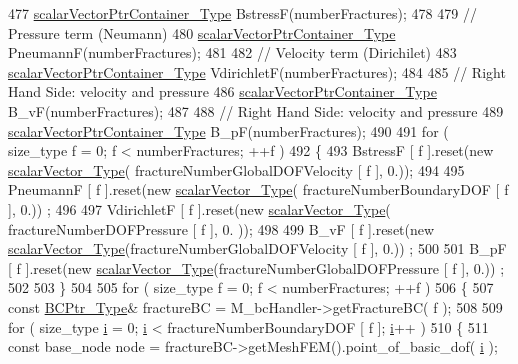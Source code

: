 \begin{DoxyCode}
477     \hyperlink{Core_8h_a20f0354ac7b92989514c678f4cdfcb6b}{scalarVectorPtrContainer\_Type} BstressF(numberFractures);
478 
479     \textcolor{comment}{// Pressure term (Neumann)}
480     \hyperlink{Core_8h_a20f0354ac7b92989514c678f4cdfcb6b}{scalarVectorPtrContainer\_Type} PneumannF(numberFractures);
481 
482     \textcolor{comment}{// Velocity term (Dirichilet)}
483     \hyperlink{Core_8h_a20f0354ac7b92989514c678f4cdfcb6b}{scalarVectorPtrContainer\_Type} VdirichletF(numberFractures);
484 
485     \textcolor{comment}{// Right Hand Side: velocity and pressure}
486     \hyperlink{Core_8h_a20f0354ac7b92989514c678f4cdfcb6b}{scalarVectorPtrContainer\_Type} B\_vF(numberFractures);
487 
488     \textcolor{comment}{// Right Hand Side: velocity and pressure}
489     \hyperlink{Core_8h_a20f0354ac7b92989514c678f4cdfcb6b}{scalarVectorPtrContainer\_Type} B\_pF(numberFractures);
490     
491     \textcolor{keywordflow}{for} ( size\_type f = 0; f < numberFractures; ++f )
492     \{
493         BstressF [ f ].reset(\textcolor{keyword}{new} \hyperlink{Core_8h_a4e75b5863535ba1dd79942de2846eff0}{scalarVector\_Type}( fractureNumberGlobalDOFVelocity [ f ],
       0.));
494 
495         PneumannF [ f ].reset(\textcolor{keyword}{new} \hyperlink{Core_8h_a4e75b5863535ba1dd79942de2846eff0}{scalarVector\_Type}( fractureNumberBoundaryDOF [ f ], 0.))
      ;
496 
497         VdirichletF [ f ].reset(\textcolor{keyword}{new} \hyperlink{Core_8h_a4e75b5863535ba1dd79942de2846eff0}{scalarVector\_Type}( fractureNumberDOFPressure [ f ], 0.
      ));
498 
499         B\_vF [ f ].reset(\textcolor{keyword}{new} \hyperlink{Core_8h_a4e75b5863535ba1dd79942de2846eff0}{scalarVector\_Type}(fractureNumberGlobalDOFVelocity [ f ], 0.))
      ;
500 
501         B\_pF [ f ].reset(\textcolor{keyword}{new} \hyperlink{Core_8h_a4e75b5863535ba1dd79942de2846eff0}{scalarVector\_Type}(fractureNumberGlobalDOFPressure [ f ], 0.))
      ;
502         
503     \}
504 
505     \textcolor{keywordflow}{for} ( size\_type f = 0; f < numberFractures; ++f )
506     \{
507         \textcolor{keyword}{const} \hyperlink{BC_8h_a088c36f945ad8f6e7e0c7c423994c6ec}{BCPtr\_Type}& fractureBC = M\_bcHandler->getFractureBC( f );
508 
509         \textcolor{keywordflow}{for} ( size\_type \hyperlink{matrici_8m_a6f6ccfcf58b31cb6412107d9d5281426}{i} = 0; \hyperlink{matrici_8m_a6f6ccfcf58b31cb6412107d9d5281426}{i} < fractureNumberBoundaryDOF [ f ]; \hyperlink{matrici_8m_a6f6ccfcf58b31cb6412107d9d5281426}{i}++ )
510         \{
511             \textcolor{keyword}{const} base\_node node = fractureBC->getMeshFEM().point\_of\_basic\_dof( 
      \hyperlink{matrici_8m_a6f6ccfcf58b31cb6412107d9d5281426}{i} );

\end{DoxyCode}

